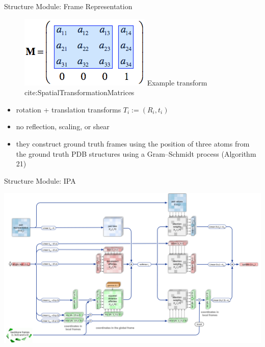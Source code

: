 \documentclass[presentation, smaller]{beamer}
\begin{document}
\begin{frame}[label={sec:orgcd6ca1b}]{Structure Module: Frame Representation}
\begin{figure}[htbp]
\centering
\includegraphics[width=.9\linewidth]{./imgs/TransformationMatrix1.png}
{Example transform cite:SpatialTransformationMatrices}
\end{figure}

\begin{itemize}
\item rotation + translation transforms \(T_i := (R_i,t_i)\)
\item no reflection, scaling, or shear
\item they construct ground truth frames using the position of three atoms from the ground truth PDB structures using a Gram–Schmidt process (Algorithm 21)
\end{itemize}
\end{frame}
\begin{frame}[label={sec:orgfcdc878}]{Structure Module: IPA \cite{jumperHighlyAccurateProtein2021}}
\begin{center}
\includegraphics[width=.9\linewidth]{./imgs/ipa.png}
\end{center}
\end{frame}
\end{document}
